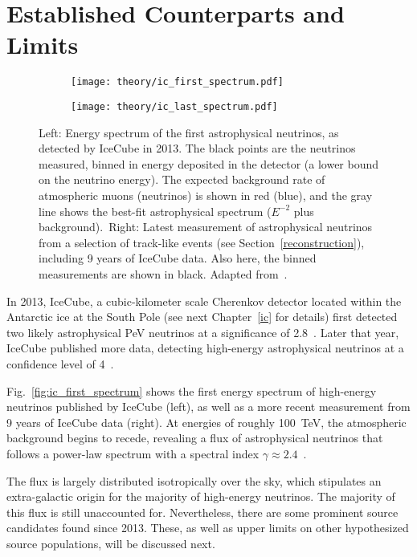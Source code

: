\section{Established Counterparts and Limits}

\begin{figure}[htb]
  \centering
  \begin{subfigure}[b]{0.52\textwidth}
    \centering
    \texttt{[image: theory/ic\_first\_spectrum.pdf]}
  \end{subfigure}
  \begin{subfigure}[b]{0.47\textwidth}
    \centering
    \texttt{[image: theory/ic\_last\_spectrum.pdf]}
  \end{subfigure}
  \caption[Astrophysical neutrino spectrum]{Left: Energy spectrum of the first astrophysical neutrinos, as detected by IceCube in 2013. The black points are the neutrinos measured, binned in energy deposited in the detector (a lower bound on the neutrino energy). The expected background rate of atmospheric muons (neutrinos) is shown in red (blue), and the gray line shows the best-fit astrophysical spectrum ($E^{-2}$ plus background).\ Right: Latest measurement of astrophysical neutrinos from a selection of track-like events (see Section~\ref{reconstruction}), including 9 years of IceCube data. Also here, the binned measurements are shown in black. Adapted from~\cite{Aartsen2013,Abbasi2022b}.}
\end{figure}

In 2013, IceCube, a cubic-kilometer scale Cherenkov detector located within the Antarctic ice at the South Pole (see next Chapter~\ref{ic} for details) first detected two likely astrophysical \unit{\peta\eV} neutrinos at a significance of \SI{2.8}{\sigma}~. Later that year, IceCube published more data, detecting high-energy astrophysical neutrinos at a confidence level of \SI{4}{\sigma}~.

Fig.~\ref{fig:ic_first_spectrum} shows the first energy spectrum of high-energy neutrinos published by IceCube (left), as well as a more recent measurement from 9 years of IceCube data (right). At energies of roughly \SI{100}{\tera\eV}, the atmospheric background begins to recede, revealing a flux of astrophysical neutrinos that follows a power-law spectrum with a spectral index $\gamma\approx2.4$~.

The flux is largely distributed isotropically over the sky, which stipulates an extra-galactic origin for the majority of high-energy neutrinos. The majority of this flux is still unaccounted for. Nevertheless, there are some prominent source candidates found since 2013. These, as well as upper limits on other hypothesized source populations, will be discussed next.

